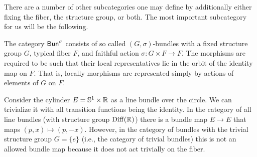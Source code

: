 There are a number of other subcategories one may define by additionally either fixing the fiber, the structure group, or both. The most important subcategory for us will be the following.

\begin{defn}\label{def FB^sigma}
    The category $\mathsf{Bun}^\sigma$ consists of so called $(G,\sigma)$-bundles with a fixed structure group $G$, typical fiber $F$, and faithful action $\sigma:G\times F\to F$. The morphisms are required to be such that their local representatives lie in the orbit of the identity map on $F$. That is, locally morphisms are represented simply by actions of elements of $G$ on $F$.
\end{defn}


\begin{example}
    Consider the cylinder $E=\mathbb{S}^1\times\mathbb{R} $ as a line bundle over the circle. We can trivialize it with all transition functions being the identity. In the category of all line bundles (with structure group $\operatorname{Diff}(\mathbb{R} )$) there is a bundle map $E\to E$ that maps $(p,x)\mapsto (p,-x)$. However, in the category of bundles with the trivial structure group $G=\{e\}$ (i.e., the category of trivial bundles) this is not an allowed bundle map because it does not act trivially on the fiber.
\end{example}


